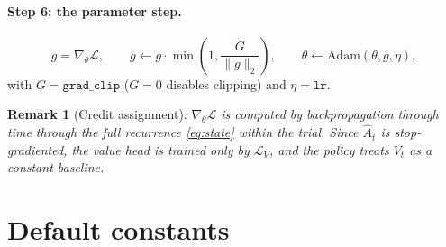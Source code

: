 \documentclass[11pt]{article}
\newtheorem{remark}{Remark}
\newcommand{\1}{\mathbf{1}}
\begin{document}
\paragraph{Step 6: the parameter step.}
\begin{equation}
  g = \nabla_\theta \mathcal{L}, \qquad
  g \leftarrow g \cdot \min\!\left(1, \frac{G}{\|g\|_2}\right), \qquad
  \theta \leftarrow \mathrm{Adam}(\theta, g, \eta),
\end{equation}
with $G = \texttt{grad\_clip}$ ($G = 0$ disables clipping) and $\eta = \texttt{lr}$.

\begin{remark}[Credit assignment]
$\nabla_\theta \mathcal{L}$ is computed by backpropagation through time through the full
recurrence \eqref{eq:state} within the trial. Since $\hat A_t$ is stop-gradiented, the
value head is trained only by $\mathcal{L}_V$, and the policy treats $V_t$ as a constant
baseline.
\end{remark}

\section{Default constants}\label{sec:consts}
\end{document}
